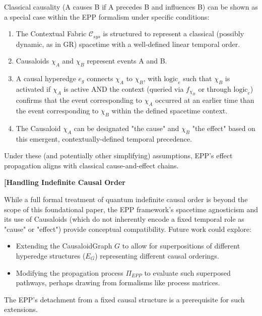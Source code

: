 Classical causality (A causes B if A precedes B and influences B) can be shown as a special case within the EPP formalism under specific conditions:
\begin{enumerate}
    \item The Contextual Fabric \(\mathcal{C}_{sys}\) is structured to represent a classical (possibly dynamic, as in GR) spacetime with a well-defined linear temporal order.
    \item Causaloids \(\chi_A\) and \(\chi_B\) represent events A and B.
    \item A causal hyperedge \(e_g\) connects \(\chi_A\) to \(\chi_B\), with \(\text{logic}_e\) such that \(\chi_B\) is activated if \(\chi_A\) is active AND the context (queried via \(f_{\chi_B}\) or through \(\text{logic}_e\)) confirms that the event corresponding to \(\chi_A\) occurred at an earlier time than the event corresponding to \(\chi_B\) within the defined spacetime context.
    \item The Causaloid \(\chi_A\) can be designated "the cause" and \(\chi_B\) "the effect" based on this emergent, contextually-defined temporal precedence.
\end{enumerate}
Under these (and potentially other simplifying) assumptions, EPP's effect propagation aligns with classical cause-and-effect chains.


\textbf{[Handling Indefinite Causal Order}

While a full formal treatment of quantum indefinite causal order is beyond the scope of this foundational paper, the EPP framework's spacetime agnosticism and its use of Causaloids (which do not inherently encode a fixed temporal role as "cause" or "effect") provide conceptual compatibility. Future work could explore:
\begin{itemize}
    \item Extending the CausaloidGraph \(G\) to allow for superpositions of different hyperedge structures (\(E_G\)) representing different causal orderings.
    \item Modifying the propagation process \(\Pi_{EPP}\) to evaluate such superposed pathways, perhaps drawing from formalisms like process matrices.
\end{itemize}
The EPP's detachment from a fixed causal structure is a prerequisite for such extensions.



